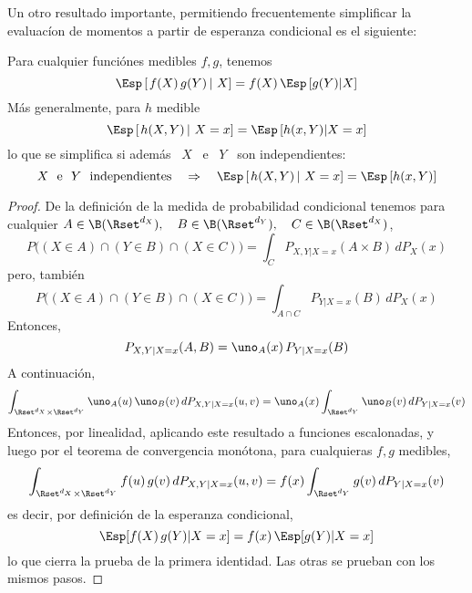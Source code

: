 Un  otro   resultado  importante,  permitiendo   frecuentemente  simplificar  la
evaluac\'ion de momentos a partir de esperanza condicional es el siguiente:
%
\begin{teorema}\label{Teo:MP:EsperanzaCondicionalFXY}
%
  Para cualquier funci\'ones medibles $f, g$, tenemos
  \[
  \Esp\left[ \left.  f(X) \, g(Y) \, \right|  \, X \right] =  f(X) \, \Esp\left[
    g(Y) | X\right]
  \]
  M\'as generalmente, para $h$ medible
  \[
  \Esp\left[ \left.  h(X,Y) \, \right|  \, X=x \right] =  \Esp\left[
    h(x,Y) | X=x\right]
  \]
  lo que se simplifica si adem\'as \ $X$ \ e \ $Y$ \ son independientes:
  \[
  \mbox{$X$  \ e  \ $Y$  \  independientes} \quad  \Rightarrow \quad  \Esp\left[
    \left.  h(X,Y) \, \right| \, X=x \right] = \Esp\left[ h(x,Y) \right]
  \]
\end{teorema}
%
\begin{proof}
  De  la definici\'on  de la  medida  de probabilidad  condicional tenemos  para
  cualquier $A  \in \B(\Rset^{d_X}),  \quad B \in  \B(\Rset^{d_Y}), \quad  C \in
  \B(\Rset^{d_X})$,
  \[
  P\big( (X \in  A) \cap (Y \in B)  \cap (X \in C) \big)  = \int_C P_{X,Y|X=x}(A
  \times B) \, dP_X(x)
  \]
  pero, tambi\'en
  \[
  P\big(  (X \in  A) \cap  (Y \in  B) \cap  (X \in  C) \big)  = \int_{A  \cap C}
  P_{Y|X=x}(B) \, dP_X(x)
  \]
  Entonces,
  \[
  P_{X,Y|X=x}(A,B) = \uno_A(x) \, P_{Y|X=x}(B)
  \]
  A continuaci\'on,
  \[
  \int_{\Rset^{d_X}    \times    \Rset^{d_Y}}    \uno_A(u)   \,    \uno_B(v)    \,
  dP_{X,Y|X=x}(u,v) = \uno_A(x) \int_{\Rset^{d_Y}} \uno_B(v) \, dP_{Y|X=x}(v)
  \]
  Entonces, por linealidad, aplicando  este resultado a funciones escalonadas, y
  luego  por el  teorema de  convergencia  mon\'otona, para  cualquieras $f,  g$
  medibles,
  \[
  \int_{\Rset^{d_X}  \times \Rset^{d_Y}}  f(u) \, g(v)  \, dP_{X,Y|X=x}(u,v) =
  f(x) \int_{\Rset^{d_Y}} g(v) \, dP_{Y|X=x}(v)
  \]
  es decir, por definici\'on de la esperanza condicional,
  \[
  \Esp[ f(X) \, g(Y) | X = x] = f(x) \, \Esp[g(Y) | X=x]
  \]
  lo que cierra la prueba de la primera identidad.  Las otras se prueban con los
  mismos pasos.
\end{proof}

